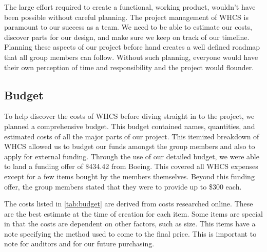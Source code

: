 The large effort required to create a functional, working product, wouldn't
have been possible without careful planning. The project management of WHCS is
paramount to our success as a team. We need to be able to estimate our costs,
discover parts for our design, and make sure we keep on track of our timeline.
Planning these aspects of our project before hand creates a well defined
roadmap that all group members can follow. Without such planning, everyone
would have their own perception of time and responsibility and the project
would flounder.

\subsection{Budget}
To help discover the costs of WHCS before diving straight in to the project, we
planned a comprehensive budget. This budget contained names, quantities, and
estimated costs of all the major parts of our project. This itemized breakdown
of WHCS allowed us to budget our funds amongst the group members and also to
apply for external funding. Through the use of our detailed budget, we were
able to land a funding offer of \$434.42 from Boeing. This covered
all WHCS expenses except for a few items bought by the members themselves.
Beyond this funding offer, the group members stated that they
were to provide up to \$300 each.

The costs listed in \autoref{tab:budget} are derived from costs researched
online. These are the best estimate at the time of creation for each item. Some
items are special in that the costs are dependent on other factors, such as
size. This items have a note specifying the method used to come to the final
price. This is important to note for auditors and for our future purchasing.

